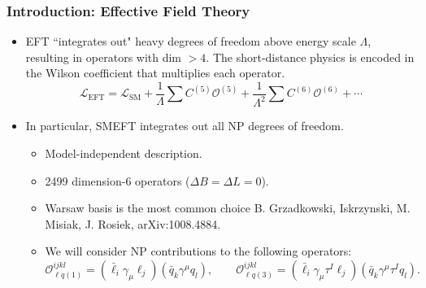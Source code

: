 \documentclass[mathserif, 10pt, dvipsnames]{beamer}
\newcommand\colorcite[1]{{\scriptsize\color{unizarblue}#1}}
\begin{document}
\begin{frame}\frametitle{Introduction: Effective Field Theory}
    \def\beamertemplatetransparentcoveredmedium{}
    \beamertemplatetransparentcoveredmedium
    \begin{itemize}
        \item  EFT ``integrates out" heavy degrees of freedom above energy scale $\Lambda$, resulting in operators with dim $> 4$. The short-distance physics is encoded in the Wilson coefficient that multiplies each operator.
              $$\mathcal{L}_\mathrm{EFT} = \mathcal{L}_\mathrm{SM} + \frac{1}{\Lambda}\sum C^{(5)} \mathcal{O}^{(5)} + \frac{1}{\Lambda^2}\sum C^{(6)} \mathcal{O}^{(6)} + \cdots$$
              \vspace{-2mm}
        \item In particular, SMEFT integrates out all NP degrees of freedom.
              \begin{itemize}
                  \item Model-independent description.
                  \item 2499 dimension-6 operators ($\Delta B = \Delta L = 0$).
\item Warsaw basis is the most common choice \colorcite{B. Grzadkowski, Iskrzynski, M. Misiak, J. Rosiek, arXiv:1008.4884}.
                  \item We will consider NP contributions to the following operators:
$$\mathcal{O}_{\ell q(1)}^{ijkl} = (\bar{\ell}_i \gamma_\mu \ell_j)(\bar{q}_k \gamma^\mu  q_l), \qquad \mathcal{O}_{\ell q(3)}^{ijkl} = (\bar{\ell}_i \gamma_\mu \tau^I \ell_j)(\bar{q}_k \gamma^\mu \tau^I q_l).$$
              \end{itemize}
    \end{itemize}
\end{frame}
\end{document}
